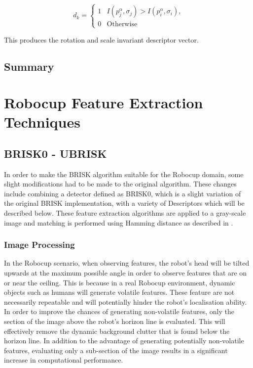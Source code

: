 \documentclass{report}
\begin{document}
\begin{equation}
d_k = \left\{ \begin{array}{rl}
1 &\mbox{$I(p_j^{\alpha}, \sigma_j) > I(p_i^{\alpha}, \sigma_i)$,} \\
0 &\mbox{Otherwise}
\end{array} \right.
\label{eqn:brightness}
\end{equation}

This produces the rotation and scale invariant descriptor vector.\\

\section{Summary}
\label{sec:summary1} 

\chapter{Robocup Feature Extraction Techniques}
\label{sec:realtimeFeatureExtraction}

\section{BRISK0 - UBRISK}
\label{sec:brisk0}
In order to make the BRISK algorithm suitable for the Robocup domain, some slight modifications had to be made to the original algorithm. These changes include combining a detector defined as BRISK0, which is a slight variation of the original BRISK implementation, with a variety of Descriptors which will be described below. These feature extraction algorithms are applied to a gray-scale image and matching is performed using Hamming distance as described in .\\

\subsection{Image Processing}
\label{sec:imageProcessingBrisk}
In the Robocup scenario, when observing features, the robot's head will be tilted upwards at the maximum possible angle in order to observe features that are on or near the ceiling. This is because in a real Robocup environment, dynamic objects such as humans will generate volatile features. These feature are not necessarily repeatable and will potentially hinder the robot's localisation ability.\\

In order to improve the chances of generating non-volatile features, only the section of the image above the robot's horizon line is evaluated. This will effectively remove the dynamic background clutter that is found below the horizon line. In addition to the advantage of generating potentially non-volatile features, evaluating only a sub-section of the image results in a significant increase in computational performance. \\ 
\end{document}

